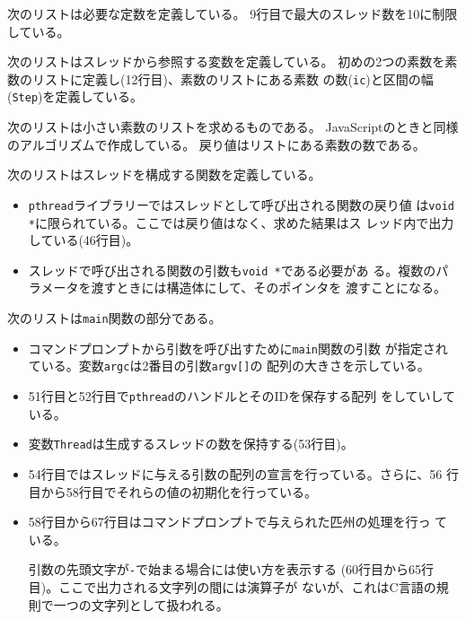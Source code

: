	次のリストは必要な定数を定義している。
	9行目で最大のスレッド数を10に制限している。

	次のリストはスレッドから参照する変数を定義している。
	初めの2つの素数を素数のリストに定義し(12行目)、素数のリストにある素数
  の数(\texttt{ic})と区間の幅(\texttt{Step})を定義している。

	次のリストは小さい素数のリストを求めるものである。
	JavaScriptのときと同様のアルゴリズムで作成している。
  戻り値はリストにある素数の数である。

	次のリストはスレッドを構成する関数を定義している。
	\begin{itemize}
	 \item 	\texttt{pthread}ライブラリーではスレッドとして呼び出される関数の戻り値
  は\texttt{void *}に限られている。ここでは戻り値はなく、求めた結果はス
  レッド内で出力している(46行目)。
	 \item スレッドで呼び出される関数の引数も\texttt{void *}である必要があ
				 る。複数のパラメータを渡すときには構造体にして、そのポインタを
				 渡すことになる。
	\end{itemize}

	次のリストは\texttt{main}関数の部分である。
\begin{itemize}
 \item コマンドプロンプトから引数を呼び出すために\texttt{main}関数の引数
			 が指定されている。変数\texttt{argc}は2番目の引数\texttt{argv[]}の
			 配列の大きさを示している。
 \item 51行目と52行目で\texttt{pthread}のハンドルとそのIDを保存する配列
			 をしていしている。
 \item 変数\texttt{Thread}は生成するスレッドの数を保持する(53行目)。
 \item 54行目ではスレッドに与える引数の配列の宣言を行っている。さらに、56
			 行目から58行目でそれらの値の初期化を行っている。
 \item 58行目から67行目はコマンドプロンプトで与えられた匹州の処理を行っ
			 ている。

			 引数の先頭文字が\texttt{-}で始まる場合には使い方を表示する
							(60行目から65行目)。ここで出力される文字列の間には演算子が
							ないが、これはC言語の規則で一つの文字列として扱われる。
\end{itemize}